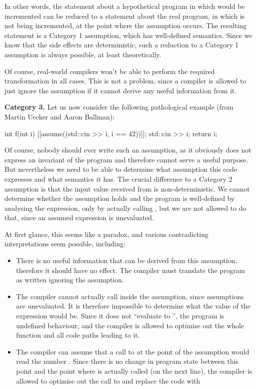 In other words, the statement about a hypothetical program in which  would be incremented can be reduced to a statement about the real program, in which  is not being incremented, at the point where the assumption occurs. The resulting statement is a Category 1 assumption, which has well-defined semantics. Since we know that the side effects are deterministic, such a reduction to a Category 1 assumption is always possible, at least theoretically.

Of course, real-world compilers won't be able to perform the required transformation in all cases. This is not a problem, since a compiler is allowed to just ignore the assumption if it cannot derive any useful information from it.

\textbf{Category 3.} Let us now consider the following pathological example (from Martin Uecker and Aaron Ballman):

\begin{codeblock}
int f(int i) {
  [[assume((std::cin >> i, i == 42))]];
  std::cin >> i;
  return i;
}
\end{codeblock}

Of course, nobody should ever write such an assumption, as it obviously does not express an invariant of the program and therefore cannot serve a useful purpose. But nevertheless we need to be able to determine what assumption this code expresses and what semantics it has. The crucial difference to a Category 2 assumption is that the input value received from  is non-deterministic. We cannot determine whether the assumption holds and the program is well-defined by analysing the expression, only by actually calling , but we are not allowed to do that, since an assumed expression is unevaluated.

At first glance, this seems like a paradox, and various contradicting interpretations seem possible, including:
\begin{itemize}
\item There is no useful information that can be derived from this assumption, therefore it should have no effect. The compiler must translate the program as written ignoring the assumption.
\item The compiler cannot actually call  inside the assumption, since assumptions are unevaluated. It is therefore impossible to determine what the value of the expression would be. Since it does not ``evaluate to '', the program is undefined behaviour, and the compiler is allowed to optimise out the whole function  and all code paths leading to it.
\item The compiler can assume that a call to  at the point of the assumption would read the number . Since there is no change in program state between this point and the point where  is actually called (on the next line), the compiler is allowed to optimise out the call to  and replace the code with 
\end{itemize}

